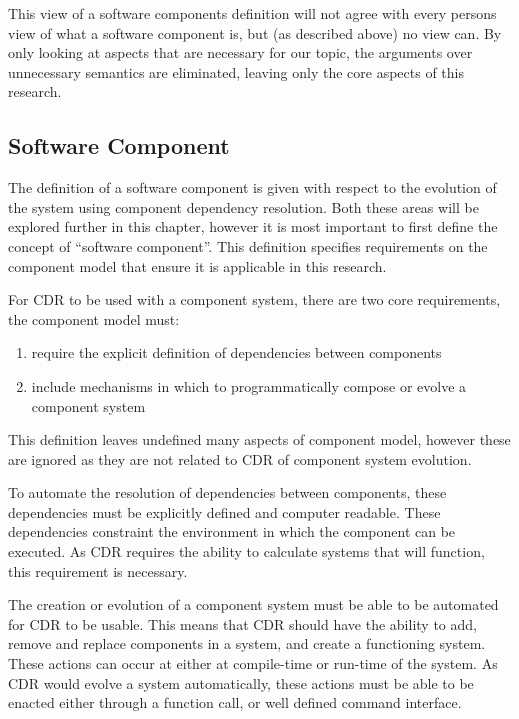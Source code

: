 This view of a software components definition will not agree with every persons view of what a software component is, but (as described above) no view can.
By only looking at aspects that are necessary for our topic, the arguments over unnecessary semantics are eliminated, leaving only the core aspects of this research. 

\subsection{Software Component}
The definition of a software component is given with respect to the evolution of the system using component dependency resolution.
Both these areas will be explored further in this chapter, however it is most important to first define the concept of ``software component''.
This definition specifies requirements on the component model that ensure it is applicable in this research.

For CDR to be used with a component system, there are two core requirements, the component model must:
\begin{enumerate}
  \item require the explicit definition of dependencies between components
  \item include mechanisms in which to programmatically compose or evolve a component system
\end{enumerate}
This definition leaves undefined many aspects of component model, however these are ignored as they are not related to CDR of component system evolution.

To automate the resolution of dependencies between components, these dependencies must be explicitly defined and computer readable.
These dependencies constraint the environment in which the component can be executed.
As CDR requires the ability to calculate systems that will function, this requirement is necessary.

The creation or evolution of a component system must be able to be automated for CDR to be usable.
This means that CDR should have the ability to add, remove and replace components in a system, and create a functioning system.
These actions can occur at either at compile-time or run-time of the system.
As CDR would evolve a system automatically, these actions must be able to be enacted either through a function call, or well defined command interface.

